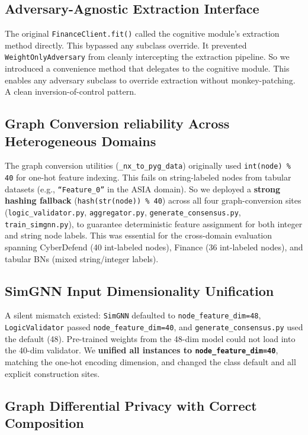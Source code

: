 \documentclass[journal]{IEEEtran}
\begin{document}
\subsection{Adversary-Agnostic Extraction Interface}

The original \texttt{FinanceClient.fit()} called the cognitive module's extraction method directly. This bypassed any subclass override. It prevented \texttt{WeightOnlyAdversary} from cleanly intercepting the extraction pipeline. So we introduced a convenience method that delegates to the cognitive module. This enables any adversary subclass to override extraction without monkey-patching. A clean inversion-of-control pattern.

\subsection{Graph Conversion reliability Across Heterogeneous Domains}

The graph conversion utilities (\texttt{\_nx\_to\_pyg\_data}) originally used \texttt{int(node) \% 40} for one-hot feature indexing. This fails on string-labeled nodes from tabular datasets (e.g., \texttt{``Feature\_0''} in the ASIA domain). So we deployed a \textbf{strong hashing fallback} (\texttt{hash(str(node)) \% 40}) across all four graph-conversion sites (\texttt{logic\_validator.py}, \texttt{aggregator.py}, \texttt{generate\_consensus.py}, \texttt{train\_simgnn.py}), to guarantee deterministic feature assignment for both integer and string node labels. This was essential for the cross-domain evaluation spanning CyberDefend (40 int-labeled nodes), Finance (36 int-labeled nodes), and tabular BNs (mixed string/integer labels).

\subsection{SimGNN Input Dimensionality Unification}

A silent mismatch existed: \texttt{SimGNN} defaulted to \texttt{node\_feature\_dim=48}, \texttt{LogicValidator} passed \texttt{node\_feature\_dim=40}, and \texttt{generate\_consensus.py} used the default (48). Pre-trained weights from the 48-dim model could not load into the 40-dim validator. We \textbf{unified all instances to \texttt{node\_feature\_dim=40}}, matching the one-hot encoding dimension, and changed the class default and all explicit construction sites.

\subsection{Graph Differential Privacy with Correct Composition}
\end{document}
